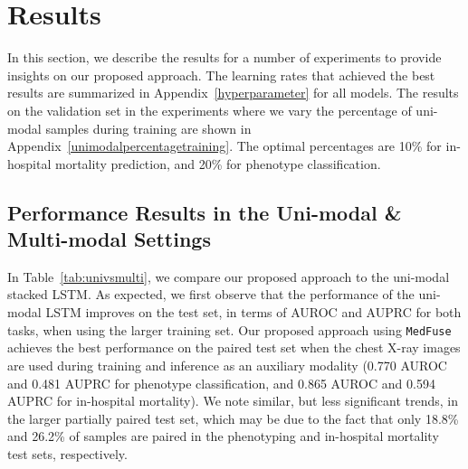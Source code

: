 \documentclass[pmlr]{jmlr}
\begin{document}
\vspace{-0.5mm}
\section{Results}
\label{sec:res}
In this section, we describe the results for a number of experiments to provide insights on our proposed approach. The learning rates that achieved the best results are summarized in Appendix~\ref{hyperparameter} for all models. The results on the validation set in the experiments where we vary the percentage of uni-modal samples during training are shown in Appendix~\ref{unimodalpercentagetraining}. The optimal percentages are 10\% for in-hospital mortality prediction, and 20\% for phenotype classification. 

\vspace{-2mm}
\subsection{Performance Results in the Uni-modal \& Multi-modal Settings}
In Table~\ref{tab:univsmulti}, we compare our proposed approach to the uni-modal stacked LSTM. As expected, we first observe that the performance of the uni-modal LSTM improves on the  test set, in terms of AUROC and AUPRC for both tasks, when using the larger  training set.  Our proposed approach using \texttt{MedFuse} achieves the best performance on the paired test set when the chest X-ray images are used during training and inference as an auxiliary modality (0.770 AUROC and 0.481 AUPRC for phenotype classification, and 0.865 AUROC and 0.594 AUPRC for in-hospital mortality). We note similar, but less significant trends, in the larger partially paired test set, which may be due to the fact that only 18.8\% and 26.2\% of samples are paired in the phenotyping and in-hospital mortality test sets, respectively. 


\vspace{-2mm}
\end{document}
